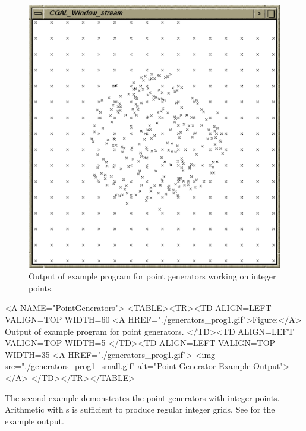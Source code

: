 \begin{ccTexOnly}
\begin{figure}
\begin{minipage}{0.45\textwidth}
      \includegraphics[width=\textwidth]{generators_prog2.ps}
      \caption{Output of example program for point generators working
        on integer points.}
      \label{figureIntegerPointGenerator}
    \end{minipage}%
  \end{figure}
\end{ccTexOnly}

\begin{ccHtmlOnly}
  <A NAME="PointGenerators">
  <TABLE><TR><TD ALIGN=LEFT VALIGN=TOP WIDTH=60%
    <A HREF="./generators_prog1.gif">Figure:</A>
    Output of example program for point generators.
  </TD><TD ALIGN=LEFT VALIGN=TOP WIDTH=5%
  </TD><TD ALIGN=LEFT VALIGN=TOP WIDTH=35%
    <A HREF="./generators_prog1.gif">
        <img src="./generators_prog1_small.gif" 
             alt="Point Generator Example Output"></A>
  </TD></TR></TABLE>
\end{ccHtmlOnly}

\newpage

The second example demonstrates the point generators with integer
points. Arithmetic with s is sufficient to produce
regular integer grids. See 
for the example output.

